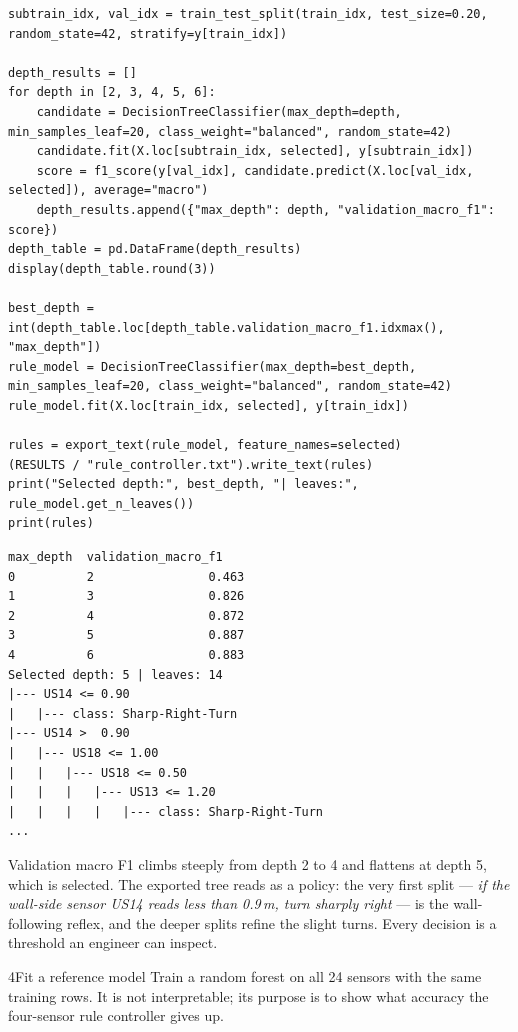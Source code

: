 \begin{labanswer}
\begin{lstlisting}[style=utppython]
subtrain_idx, val_idx = train_test_split(train_idx, test_size=0.20, random_state=42, stratify=y[train_idx])

depth_results = []
for depth in [2, 3, 4, 5, 6]:
    candidate = DecisionTreeClassifier(max_depth=depth, min_samples_leaf=20, class_weight="balanced", random_state=42)
    candidate.fit(X.loc[subtrain_idx, selected], y[subtrain_idx])
    score = f1_score(y[val_idx], candidate.predict(X.loc[val_idx, selected]), average="macro")
    depth_results.append({"max_depth": depth, "validation_macro_f1": score})
depth_table = pd.DataFrame(depth_results)
display(depth_table.round(3))

best_depth = int(depth_table.loc[depth_table.validation_macro_f1.idxmax(), "max_depth"])
rule_model = DecisionTreeClassifier(max_depth=best_depth, min_samples_leaf=20, class_weight="balanced", random_state=42)
rule_model.fit(X.loc[train_idx, selected], y[train_idx])

rules = export_text(rule_model, feature_names=selected)
(RESULTS / "rule_controller.txt").write_text(rules)
print("Selected depth:", best_depth, "| leaves:", rule_model.get_n_leaves())
print(rules)
\end{lstlisting}
\expectedoutput
\begin{lstlisting}[style=utpterminal]
   max_depth  validation_macro_f1
0          2                0.463
1          3                0.826
2          4                0.872
3          5                0.887
4          6                0.883
Selected depth: 5 | leaves: 14
|--- US14 <= 0.90
|   |--- class: Sharp-Right-Turn
|--- US14 >  0.90
|   |--- US18 <= 1.00
|   |   |--- US18 <= 0.50
|   |   |   |--- US13 <= 1.20
|   |   |   |   |--- class: Sharp-Right-Turn
...
\end{lstlisting}
Validation macro F1 climbs steeply from depth 2 to 4 and flattens at depth 5, which is selected. The exported tree reads as a policy: the very first split --- \emph{if the wall-side sensor US14 reads less than 0.9\,m, turn sharply right} --- is the wall-following reflex, and the deeper splits refine the slight turns. Every decision is a threshold an engineer can inspect.
\end{labanswer}

\begin{labquestion}{4}{Fit a reference model}
Train a random forest on all 24 sensors with the same training rows. It is not interpretable; its purpose is to show what accuracy the four-sensor rule controller gives up.
\end{labquestion}

